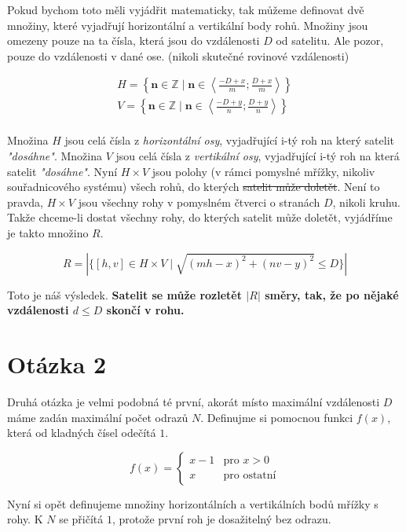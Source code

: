 \documentclass[11pt, a4paper]{article}
\begin{document}
    Pokud bychom toto měli vyjádřit matematicky, tak můžeme definovat dvě množiny, které vyjadřují horizontální a vertikální body rohů.
    Množiny jsou omezeny pouze na ta čísla, která jsou do vzdálenosti $D$ od satelitu.
    Ale pozor, pouze do vzdálenosti v dané ose.
    (nikoli skutečné rovinové vzdálenosti)

    \begin{gather*}
        H = \left\{ \mathbf{n} \in \mathbb{Z} \mid \mathbf{n} \in \left\langle \frac{-D+x}{m}; \frac{D+x}{m} \right\rangle \right\}\\
        V = \left\{ \mathbf{n} \in \mathbb{Z} \mid \mathbf{n} \in \left\langle \frac{-D+y}{n}; \frac{D+y}{n} \right\rangle \right\}\\
    \end{gather*}

    Množina $H$ jsou celá čísla z \emph{horizontální osy}, vyjadřující i-tý roh na který satelit \emph{"dosáhne"}.
    Množina $V$ jsou celá čísla z \emph{vertikální osy}, vyjadřující i-tý roh na která satelit \emph{"dosáhne"}.
    Nyní $H \times V$ jsou polohy (v rámci pomyslné mřížky, nikoliv souřadnicového systému) všech rohů, do kterých \sout{satelit může doletět}.
    Není to pravda, $H \times V$ jsou všechny rohy v pomyslném čtverci o stranách $D$, nikoli kruhu.
    Takže chceme-li dostat všechny rohy, do kterých satelit může doletět, vyjádříme je takto množino $R$.

    \[
        R = \left| \{ [h, v] \in H \times V \mid \sqrt{(mh - x)^2+(nv - y)^2} \leq D \} \right|
    \]

    Toto je náš výsledek.
    \textbf{Satelit se může rozletět $|R|$ směry, tak, že po nějaké vzdálenosti $d \leq D$ skončí v rohu.}


    \section{Otázka 2}

    Druhá otázka je velmi podobná té první, akorát místo maximální vzdálenosti $D$ máme zadán maximální počet odrazů $N$.
    Definujme si pomocnou funkci $f(x)$, která od kladných čísel odečítá $1$.

    \[
        f(x) = \begin{cases}
                   x - 1 & \text{pro } x > 0 \\
                   x & \text{pro ostatní}
        \end{cases}
    \]

    Nyní si opět definujeme množiny horizontálních a vertikálních bodů mřížky s rohy.
    K $N$ se přičítá $1$, protože první roh je dosažitelný bez odrazu.
\end{document}
